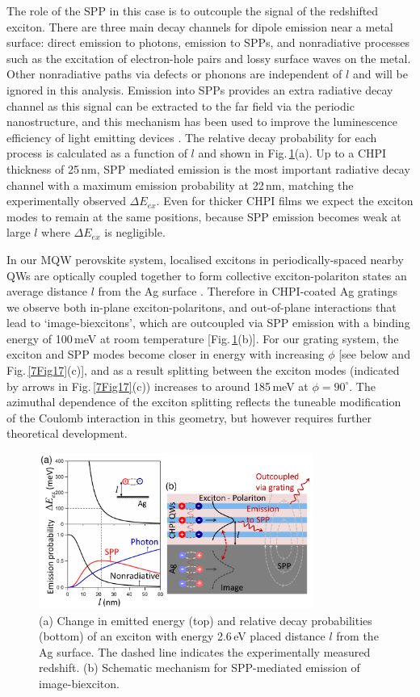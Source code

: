 The role of the SPP in this case is to outcouple the signal of the redshifted exciton. There are three main decay channels for dipole emission near a metal surface: direct emission to photons, emission to SPPs, and nonradiative processes such as the excitation of electron-hole pairs and lossy surface waves on the metal. Other nonradiative paths via defects or phonons are independent of $l$ and will be ignored in this analysis. Emission into SPPs provides an extra radiative decay channel as this signal can be extracted to the far field via the periodic nanostructure, and this mechanism has been used to improve the luminescence efficiency of light emitting devices \cite{Frischeisen2011, Kumar2012}. The relative decay probability for each process is calculated as a function of $l$ \cite{Ford1984} and shown in Fig.\,\ref{7Fig16}(a). Up to a CHPI thickness of 25\,nm, SPP mediated emission is the most important radiative decay channel with a maximum emission probability at 22\,nm, matching the experimentally observed $\Delta E_{ex}$. Even for thicker CHPI films we expect the exciton modes to remain at the same positions, because SPP emission becomes weak at large $l$ where $\Delta E_{ex}$ is negligible.

In our MQW perovskite system, localised excitons in periodically-spaced nearby QWs are optically coupled together to form collective exciton-polariton states an average distance $l$ from the Ag surface \cite{Pbbr2008, Baumberg1998, Kavokin1998, Vladimirova1998}. Therefore in CHPI-coated Ag gratings we observe both in-plane exciton-polaritons, and out-of-plane interactions that lead to `image-biexcitons', which are outcoupled via SPP emission with a binding energy of 100\,meV at room temperature [Fig.\,\ref{7Fig16}(b)]. For our grating system, the exciton and SPP modes become closer in energy with increasing $\phi$ [see below and Fig.\,\ref{7Fig17}(c)], and as a result splitting between the exciton modes (indicated by arrows in Fig.\,\ref{7Fig17}(c)) increases to around 185\,meV at $\phi=90^{\circ}$. The azimuthal dependence of the exciton splitting reflects the tuneable modification of the Coulomb interaction in this geometry, but however requires further theoretical development.
\begin{figure}[ht] 
\centering    
\includegraphics[width=0.8\textwidth]{Fig16}
\caption{(a) Change in emitted energy (top) and relative decay probabilities (bottom) of an exciton with energy 2.6\,eV placed distance $l$ from the Ag surface. The dashed line indicates the experimentally measured redshift. (b) Schematic mechanism for SPP-mediated emission of image-biexciton.}
\label{7Fig16}
\end{figure}

